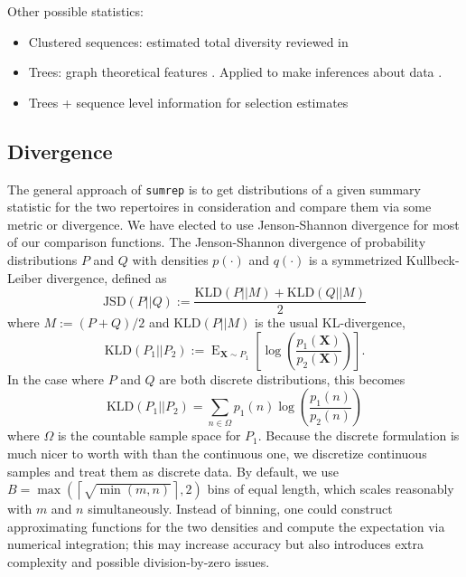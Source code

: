 \documentclass{article}
\begin{document}
Other possible statistics:

\begin{itemize}
\item Clustered sequences: estimated total diversity reviewed in \cite{Mehr2012-se}
\item Trees: graph theoretical features \cite{Dunn-Walters2002-cu,Dunn-Walters2004-hv,Mehr2004-ej,Shahaf2008-cc,Budeus2015-ab,Yaari2015-ss}.
Applied to make inferences about data \cite{Steiman-Shimony2006-fm}.
\item Trees + sequence level information for selection estimates \cite{Uduman2014-pb}
\end{itemize}


\subsection*{Divergence}
The general approach of \texttt{sumrep} is to get distributions of a given summary statistic for the two repertoires in consideration and compare them via some metric or divergence.
We have elected to use Jenson-Shannon divergence for most of our comparison functions.
The Jenson-Shannon divergence of probability distributions $P$ and $Q$ with densities $p(\cdot)$ and $q(\cdot)$ is a symmetrized Kullbeck-Leiber divergence, defined as
\begin{equation}
\text{JSD}\left(P || Q\right) := \frac{\text{KLD}\left(P || M\right) + \text{KLD}\left(Q || M\right)}{2}
\end{equation}
where $M := (P + Q)/2$ and $\text{KLD}(P || M)$ is the usual KL-divergence,
\begin{equation}
\text{KLD}\left(P_1 || P_2\right) := \operatorname{E}_{\mathbf X \sim P_1}\left[ \log\left(\frac{p_1(\mathbf X)}{p_2(\mathbf X)}\right) \right].
\end{equation}
In the case where $P$ and $Q$ are both discrete distributions, this becomes
\begin{equation}
\text{KLD}\left(P_1 || P_2\right) = \sum_{n \in \Omega} p_1(n) \log\left( \frac{p_1(n)}{p_2(n)} \right)
\end{equation}
where $\Omega$ is the countable sample space for $P_1$.
Because the discrete formulation is much nicer to worth with than the continuous one, we discretize continuous samples and treat them as discrete data.
By default, we use $B = \max\left(\left\lceil \sqrt{\min(m, n)} \right \rceil, 2\right)$ bins of equal length, which scales reasonably with $m$ and $n$ simultaneously.
Instead of binning, one could construct approximating functions for the two densities and compute the expectation via numerical integration; this may increase accuracy but also introduces extra complexity and possible division-by-zero issues.
\end{document}
